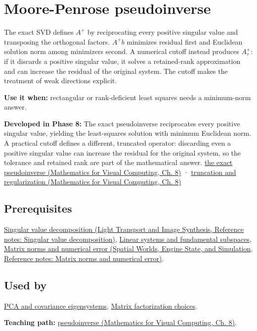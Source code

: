 \hypertarget{appendix-541306fdbc1b}{}\label{referencestart:appendix-541306fdbc1b}
\section{Moore-Penrose pseudoinverse}\label{appendix-541306fdbc1b-moore-penrose-pseudoinverse}

The exact SVD defines \(A^+\) by reciprocating every positive singular value and transposing the orthogonal factors. \(A^+b\) minimizes residual first and Euclidean solution norm among minimizers second. A numerical cutoff instead produces \(A_\tau^+\): if it discards a positive singular value, it solves a retained-rank approximation and can increase the residual of the original system. The cutoff makes the treatment of weak directions explicit.

\textbf{Use it when:} rectangular or rank-deficient least squares needs a minimum-norm answer.

\textbf{Developed in Phase 8:} The exact pseudoinverse reciprocates every positive singular value, yielding the least-squares solution with minimum Euclidean norm. A practical cutoff defines a different, truncated operator: discarding even a positive singular value can increase the residual for the original system, so the tolerance and retained rank are part of the mathematical answer. \href{../02-Mathematics-for-Visual-Computing/main.pdf\#nameddest=02-foundations-ii-ch024-the-moorepenrose-inverse-and-its-four-identities}{the exact pseudoinverse (Mathematics for Visual Computing, Ch. 8)} · \href{../02-Mathematics-for-Visual-Computing/main.pdf\#nameddest=02-foundations-ii-ch024-thresholding-and-regularization-are-different-choices}{truncation and regularization (Mathematics for Visual Computing, Ch. 8)}

\subsection{Prerequisites}\label{appendix-541306fdbc1b-prerequisites}

\href{../04-Light-Transport-and-Image-Synthesis/main.pdf\#nameddest=appendix-1fad5e7f36fa}{Singular value decomposition (Light Transport and Image Synthesis, Reference notes: Singular value decomposition)}, \hyperref[appendix-8572a4a060c1]{Linear systems and fundamental subspaces}, \href{../05-Spatial-Worlds-Engine-State-and-Simulation/main.pdf\#nameddest=appendix-f8657bac66e5}{Matrix norms and numerical error (Spatial Worlds, Engine State, and Simulation, Reference notes: Matrix norms and numerical error)}.

\subsection{Used by}\label{appendix-541306fdbc1b-used-by}

\hyperref[appendix-ad175ef3c5bf]{PCA and covariance eigensystems}, \hyperref[appendix-221a483bec2d]{Matrix factorization choices}.

\textbf{Teaching path:} \href{../02-Mathematics-for-Visual-Computing/main.pdf\#nameddest=02-foundations-ii-ch024-pseudoinverse-makes-least-squares-and-minimum-norm-one-operation}{pseudoinverse (Mathematics for Visual Computing, Ch. 8)}.
